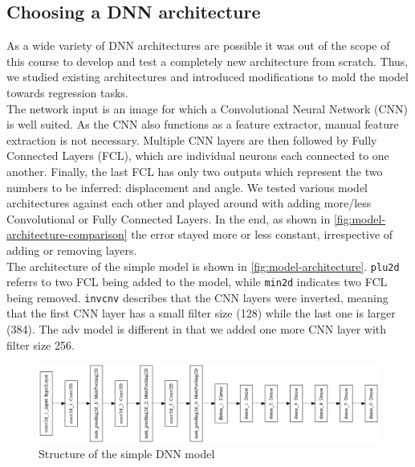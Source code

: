 \documentclass[10pt,a4paper,twoside,journal]{IEEEtran}
\begin{document}
\subsection{Choosing a DNN architecture}
\label{ssc:architecture-choice}
As a wide variety of DNN architectures are possible it was out of the scope of this course to develop and test a completely new architecture from scratch. Thus, we studied existing architectures and introduced modifications to mold the model towards regression tasks. \\
The network input is an image for which a Convolutional Neural Network (CNN) is well suited. As the CNN also functions as a feature extractor, manual feature extraction is not necessary. Multiple CNN layers are then followed by Fully Connected Layers (FCL), which are individual neurons each connected to one another. Finally, the last FCL has only two outputs which represent the two numbers to be inferred: displacement and angle. We tested various model architectures against each other and played around with adding more/less Convolutional or Fully Connected Layers. In the end, as shown in \autoref{fig:model-architecture-comparison} the error stayed more or less constant, irrespective of adding or removing layers. \\
The architecture of the simple model is shown in \autoref{fig:model-architecture}. \texttt{plu2d} referrs to two FCL being added to the model, while \texttt{min2d} indicates two FCL being removed. \texttt{invcnv} describes that the CNN layers were inverted, meaning that the first CNN layer has a small filter size (128) while the last one is larger (384). The adv model is different in that we added one more CNN layer with filter size 256.

\begin{figure}[ht]
	\centering
	\includegraphics[width=\columnwidth]{attachments/model-52797-rot.png}
	\caption{Structure of the simple DNN model}
	\label{fig:model-architecture}
\end{figure}
\end{document}
